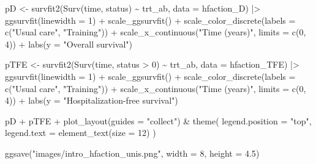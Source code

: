 \documentclass[
  letterpaper,
  DIV=11,
  numbers=noendperiod]{scrreprt}
\newenvironment{Shaded}{\begin{snugshade}}{\end{snugshade}}
\newcommand{\AttributeTok}[1]{\textcolor[rgb]{0.40,0.45,0.13}{#1}}
\newcommand{\DecValTok}[1]{\textcolor[rgb]{0.68,0.00,0.00}{#1}}
\newcommand{\FloatTok}[1]{\textcolor[rgb]{0.68,0.00,0.00}{#1}}
\newcommand{\FunctionTok}[1]{\textcolor[rgb]{0.28,0.35,0.67}{#1}}
\newcommand{\NormalTok}[1]{\textcolor[rgb]{0.00,0.23,0.31}{#1}}
\newcommand{\OtherTok}[1]{\textcolor[rgb]{0.00,0.23,0.31}{#1}}
\newcommand{\SpecialCharTok}[1]{\textcolor[rgb]{0.37,0.37,0.37}{#1}}
\newcommand{\StringTok}[1]{\textcolor[rgb]{0.13,0.47,0.30}{#1}}
\begin{document}
\begin{Shaded}
\begin{Highlighting}[]
\NormalTok{pD }\OtherTok{\textless{}{-}} \FunctionTok{survfit2}\NormalTok{(}\FunctionTok{Surv}\NormalTok{(time, status) }\SpecialCharTok{\textasciitilde{}}\NormalTok{ trt\_ab, }\AttributeTok{data =}\NormalTok{ hfaction\_D) }\SpecialCharTok{|\textgreater{}}
  \FunctionTok{ggsurvfit}\NormalTok{(}\AttributeTok{linewidth =} \DecValTok{1}\NormalTok{) }\SpecialCharTok{+}
  \FunctionTok{scale\_ggsurvfit}\NormalTok{() }\SpecialCharTok{+}
  \FunctionTok{scale\_color\_discrete}\NormalTok{(}\AttributeTok{labels =} \FunctionTok{c}\NormalTok{(}\StringTok{"Usual care"}\NormalTok{, }\StringTok{"Training"}\NormalTok{)) }\SpecialCharTok{+}
  \FunctionTok{scale\_x\_continuous}\NormalTok{(}\StringTok{"Time (years)"}\NormalTok{, }\AttributeTok{limits =} \FunctionTok{c}\NormalTok{(}\DecValTok{0}\NormalTok{, }\DecValTok{4}\NormalTok{)) }\SpecialCharTok{+}
  \FunctionTok{labs}\NormalTok{(}\AttributeTok{y =} \StringTok{"Overall survival"}\NormalTok{)}

\NormalTok{pTFE }\OtherTok{\textless{}{-}} \FunctionTok{survfit2}\NormalTok{(}\FunctionTok{Surv}\NormalTok{(time, status }\SpecialCharTok{\textgreater{}} \DecValTok{0}\NormalTok{) }\SpecialCharTok{\textasciitilde{}}\NormalTok{ trt\_ab, }\AttributeTok{data =}\NormalTok{ hfaction\_TFE) }\SpecialCharTok{|\textgreater{}}
  \FunctionTok{ggsurvfit}\NormalTok{(}\AttributeTok{linewidth =} \DecValTok{1}\NormalTok{) }\SpecialCharTok{+}
  \FunctionTok{scale\_ggsurvfit}\NormalTok{() }\SpecialCharTok{+}
  \FunctionTok{scale\_color\_discrete}\NormalTok{(}\AttributeTok{labels =} \FunctionTok{c}\NormalTok{(}\StringTok{"Usual care"}\NormalTok{, }\StringTok{"Training"}\NormalTok{)) }\SpecialCharTok{+}
  \FunctionTok{scale\_x\_continuous}\NormalTok{(}\StringTok{"Time (years)"}\NormalTok{, }\AttributeTok{limits =} \FunctionTok{c}\NormalTok{(}\DecValTok{0}\NormalTok{, }\DecValTok{4}\NormalTok{)) }\SpecialCharTok{+}
  \FunctionTok{labs}\NormalTok{(}\AttributeTok{y =} \StringTok{"Hospitalization{-}free survival"}\NormalTok{)}


\NormalTok{pD }\SpecialCharTok{+}\NormalTok{ pTFE }\SpecialCharTok{+} \FunctionTok{plot\_layout}\NormalTok{(}\AttributeTok{guides =} \StringTok{"collect"}\NormalTok{) }\SpecialCharTok{\&} 
  \FunctionTok{theme}\NormalTok{(}
    \AttributeTok{legend.position =} \StringTok{"top"}\NormalTok{, }
    \AttributeTok{legend.text =} \FunctionTok{element\_text}\NormalTok{(}\AttributeTok{size =} \DecValTok{12}\NormalTok{)}
\NormalTok{    )}

\FunctionTok{ggsave}\NormalTok{(}\StringTok{"images/intro\_hfaction\_unis.png"}\NormalTok{, }\AttributeTok{width =} \DecValTok{8}\NormalTok{, }\AttributeTok{height =} \FloatTok{4.5}\NormalTok{)}


\end{Highlighting}
\end{Shaded}
\end{document}
